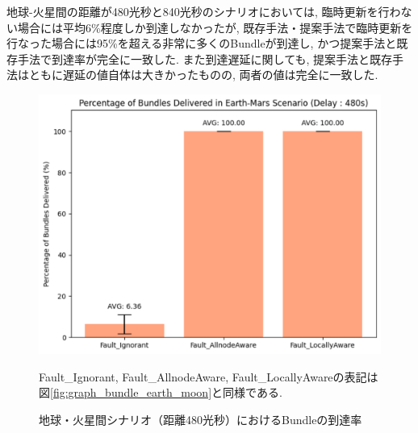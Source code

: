 地球-火星間の距離が480光秒と840光秒のシナリオにおいては, 
臨時更新を行わない場合には平均6\%程度しか到達しなかったが,
既存手法・提案手法で臨時更新を行なった場合には95\%を超える非常に多くのBundleが到達し, 
かつ提案手法と既存手法で到達率が完全に一致した.
また到達遅延に関しても, 提案手法と既存手法はともに遅延の値自体は大きかったものの, 両者の値は完全に一致した. 
\begin{figure}[tbh]
    \centering
    \includegraphics[width=0.7\textheight]{img/mars_480_bundle.pdf}
    \caption{地球・火星間シナリオ（距離480光秒）におけるBundleの到達率}
    \label{fig:graph_bundle_earth_mars_480}
    \begin{minipage}{\textwidth}
        \centering
        \vspace{3mm}
        \fontsize{10.5pt}{12pt}\selectfont
        Fault\_Ignorant, Fault\_AllnodeAware, Fault\_LocallyAwareの表記は
        図\ref{fig:graph_bundle_earth_moon}と同様である.
    \end{minipage}
\end{figure}


